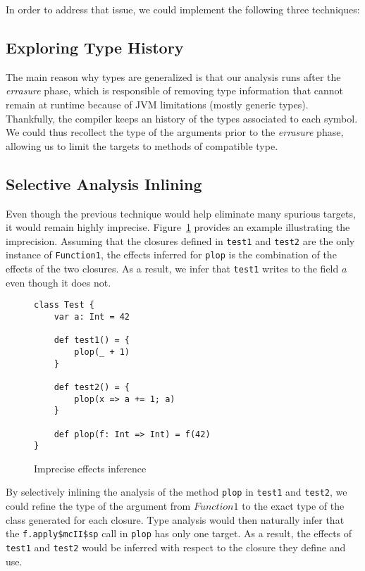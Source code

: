 In order to address that issue, we could implement the following three
techniques:

\subsection{Exploring Type History}
The main reason why types are generalized is that our analysis runs
after the \emph{errasure} phase, which is responsible of removing type
information that cannot remain at runtime because of JVM limitations (mostly
generic types). Thankfully, the compiler keeps an history of the types
associated to each symbol. We could thus recollect the type of the arguments
prior to the \emph{errasure} phase, allowing us to limit the targets to methods
of compatible type.

\subsection{Selective Analysis Inlining}
Even though the previous technique would help eliminate many spurious targets,
it would remain highly imprecise. Figure~\ref{fig:con:inl} provides an example
illustrating the imprecision. Assuming that the closures defined in
\lstinline{test1} and \lstinline{test2} are the only instance of
\lstinline{Function1}, the effects inferred for \lstinline{plop} is the
combination of the effects of the two closures. As a result, we infer that
\lstinline{test1} writes to the field $a$ even though it does not.

\begin{figure}[h]
    \centering
\begin{lstlisting}
class Test {
    var a: Int = 42

    def test1() = {
        plop(_ + 1)
    }

    def test2() = {
        plop(x => a += 1; a)
    }

    def plop(f: Int => Int) = f(42)
}
\end{lstlisting}
    \caption{Imprecise effects inference}
    \label{fig:con:inl}
\end{figure}

By selectively inlining the analysis of the method \lstinline{plop} in
\lstinline{test1} and \lstinline{test2}, we could refine the type of the
argument from $Function1$ to the exact type of the class generated for each
closure. Type analysis would then naturally infer that the
\lstinline{f.apply$mcII$sp} call in \lstinline{plop} has only one target.  As a
result, the effects of \lstinline{test1} and \lstinline{test2} would be
inferred with respect to the closure they define and use.

